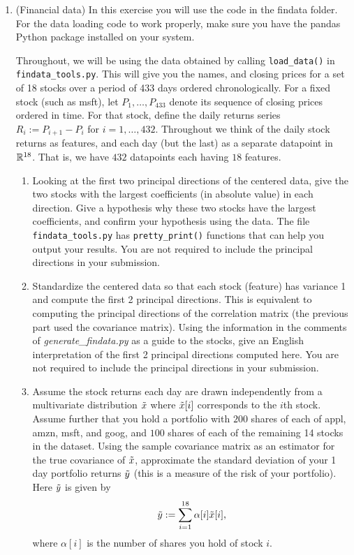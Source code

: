 \documentclass[12pt,twoside]{article}
\begin{document}
\begin{enumerate}
\begin{enumerate}
\end{enumerate}
\newpage
\item (Financial data) In this exercise you will use the code in the findata folder.
  For the data loading code to work properly, make sure you
  have the pandas Python package installed on your system.

  Throughout, we will be using the data obtained by calling
 \verb|load_data()| in \verb|findata_tools.py|.  This will
  give you the names, and closing prices for a set of 18 stocks over a
  period of 433 days ordered chronologically.
  For a fixed stock (such as msft), let
  $P_1,\ldots,P_{433}$ denote its sequence of closing prices ordered in
  time.  For that stock, define the daily returns series $R_i:=P_{i+1}-P_i$ for
  $i=1,\ldots,432$.  Throughout we think of the daily stock returns as features,
  and each day (but the last) as a separate datapoint in $\mathbb{R}^{18}$.
  That is, we have $432$ datapoints each having $18$ features.
  \begin{enumerate}
  \item Looking at the first two principal directions of the
    centered data, give the two stocks with the largest
    coefficients (in absolute value) in each direction.  
    Give a hypothesis why these two stocks have the largest
    coefficients, and confirm your hypothesis using the data.  The file 
 \verb|findata_tools.py| has \verb|pretty_print()|
    functions that can help you output your results.
    You are not required to include the principal directions in
    your submission.
  \item Standardize the centered data so that each stock (feature) has
    variance 1 and compute the first 2 principal directions.  This is
    equivalent to computing the principal directions of the
    correlation matrix (the previous part used the covariance
    matrix).  Using the information in the comments of
   \emph{generate\_findata.py} as a guide to the stocks, 
    give an English interpretation of the first 2 principal directions
    computed here. 
    You are not required to include the principal directions in
    your submission.
  \item Assume the stock returns each day are drawn independently from a
    multivariate distribution $\tilde{  x }$ where
    $\tilde{  x }[i]$ corresponds to the $i$th stock.  Assume further that
    you hold a portfolio with $200$ shares of each of appl, amzn, msft, and
    goog, and $100$ shares of each of the remaining 14 stocks in the
    dataset.  Using the sample covariance matrix as an estimator for
    the true covariance of $\tilde{  x }$, approximate the standard deviation of
    your 1 day portfolio returns $\tilde{  y }$ (this is a measure of the risk of your
    portfolio).  Here $\tilde{  y }$ is given by
    $$\tilde{  y } := \sum_{i=1}^{18} \alpha[i] \tilde{  x }[i],$$
    where $\alpha[i]$ is the number of shares you hold of stock $i$.
    

\end{enumerate}
\end{enumerate}
\end{document}
